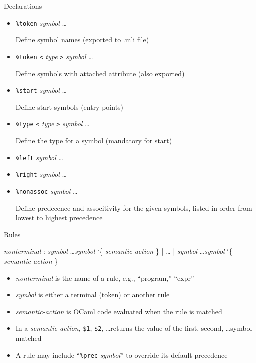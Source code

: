 \documentclass{plt}
\begin{document}
\begin{frame}[fragile]{Declarations}

\parskip=1pc

\begin{itemize}
\item \verb|%token| \emph{symbol} \ldots

 Define symbol names (exported to .mli file)

\item \verb|%token| \verb|<| \emph{type} \verb|>| \emph{symbol} \ldots

 Define symbols with attached attribute (also exported)

\item \verb|%start| \emph{symbol} \ldots

Define start symbols (entry points)

\item \verb|%type| \verb|<| \emph{type} \verb|>| \emph{symbol} \ldots

Define the type for a symbol (mandatory for start)

\item \verb|%left| \emph{symbol} \ldots

\item \verb|%right| \emph{symbol} \ldots

\item \verb|%nonassoc| \emph{symbol} \ldots

Define predecence and associtivity for the given symbols, listed in
order from lowest to highest precedence
\end{itemize}

\end{frame}

\begin{frame}[fragile]{Rules}

\begin{shadedverbatim}
\emph{nonterminal} :
    \emph{symbol} \ldots \emph{symbol} \char`\{ \emph{semantic-action} \}
  | \ldots
  | \emph{symbol} \ldots \emph{symbol} \char`\{ \emph{semantic-action} \}
\end{shadedverbatim}

\begin{itemize}
\item \emph{nonterminal} is the name of a rule, e.g., ``program,'' ``expr''
\item \emph{symbol} is either a terminal (token) or another rule
\item \emph{semantic-action} is OCaml code evaluated when the rule is
  matched
\item In a \emph{semantic-action}, \verb|$1|, \verb|$2|, \ldots returns
  the value of the first, second, \ldots symbol matched
\item A rule may include ``\verb|%prec| \emph{symbol}'' to override
                                its default precedence
\end{itemize}

\end{frame}
\end{document}
